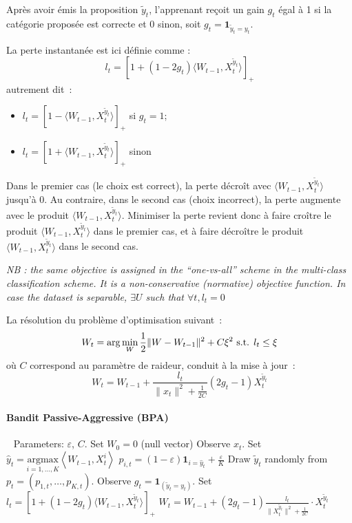 \documentclass[preprint,12pt,authoryear]{elsarticle}
\begin{document}
Après avoir émis la proposition $\tilde{y}_t$, l'apprenant reçoit un gain $g_t$ égal à 1 si la catégorie proposée est correcte et 0 sinon, soit $g_t = \mathbf{1}_{\tilde{y}_t=y_t}$. 

La perte instantanée est ici définie comme :
$$l_t = [1 + (1 - 2 g_t) \langle W_{t-1}, X_t^{\tilde{y}_t}\rangle]_+$$
autrement dit~:
\begin{itemize}
	\item[] $l_t = [1 - \langle W_{t-1}, X_t^{\tilde{y}_t}\rangle]_+$ si $g_t=1$;
	\item[] $l_t = [1 + \langle W_{t-1}, X_t^{\tilde{y}_t}\rangle]_+$ sinon
\end{itemize}
Dans le premier cas (le choix est correct), la perte décroît avec $\langle W_{t-1}, X_t^{\tilde{y}_t}\rangle$ jusqu'à 0. Au contraire, dans le second cas (choix incorrect), la perte augmente avec le produit $\langle W_{t-1}, X_t^{\tilde{y}_t}\rangle$.
Minimiser la perte revient donc à faire croître le produit $\langle W_{t-1}, X_t^{\tilde{y}_t}\rangle$ dans le premier cas, et à faire décroître le produit $\langle W_{t-1}, X_t^{\tilde{y}_t}\rangle$  dans le second cas.

\emph{NB : the same objective is assigned in the ``one-vs-all'' scheme in the multi-class classification scheme. It is a non-conservative (normative) objective function. In case the dataset is separable, $\exists U$ such that $\forall t, l_t = 0$  }

La résolution du problème d'optimisation suivant~:
$$W_{t} = \arg \min_W \frac{1}{2} \| W - W_{t-1}\|^2 + C \xi^2 \hbox{ s.t. } l_t \leq \xi$$
où $C$ correspond au paramètre de raideur, conduit à la mise à jour~:
$$W_{t} =  W_{t-1} + \frac{l_t}{\|x_t\|^2 + \frac{1}{2C}} (2g_t - 1) X_t^{\tilde{y}_t}$$

\paragraph{Bandit Passive-Aggressive (BPA)}
\begin{algorithmic}
	\STATE $\ \ $
	\STATE Parameters:  $\varepsilon$, $C$.
	\STATE Set $W_0 = 0$ (null vector)
	\STATE Observe $x_t$.
	\STATE Set $\hat{y}_t = \underset{i = 1,\dots,K}{\text{argmax}}\left\langle W_{t-1} ,X_t^i\right\rangle$
	\STATE $p_{i,t}= (1-\varepsilon)\mathbf{1}_{i = \hat{y}_t} + \frac{\varepsilon}{K}$
	\ENDFOR
	\STATE Draw $\tilde{y}_t$ randomly from $p_t = \left(p_{1,t},\dots ,p_{K,t}\right)$.
	\STATE Observe $g_t = \mathbf{1}_{(\tilde{y}_t=y_t)}$.
	\STATE Set $l_t = \left[ 1+(1-2g_t)\langle W_{t-1},X_t^{\tilde{y}_t}\rangle\right]_{+}$ 
	\STATE $W_t = W_{t-1} + (2g_t-1)\frac{l_t}{\parallel X_t^{\tilde{y}_t}\parallel^2 + \frac{1}{2C}}\cdot X_t^{\tilde{y}_t}$
	\ENDFOR
\end{algorithmic}
\end{document}
